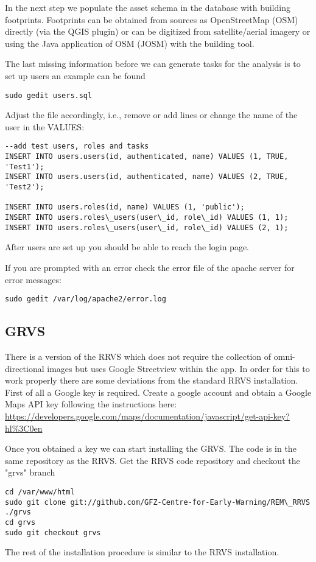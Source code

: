 \documentclass{article}
\begin{document}
In the next step we populate the asset schema in the database 
with building footprints. Footprints can be obtained from
sources as OpenStreetMap (OSM) directly (via the QGIS plugin)
 or can be digitized from 
satellite/aerial imagery or using the Java application of OSM
(JOSM) with the building tool.


The last missing information before we can generate tasks
for the analysis is to set up users an example can be found
\begin{verbatim}
sudo gedit users.sql
\end{verbatim}

Adjust the file accordingly, i.e., remove or add lines or change the
name of the user in the VALUES: 
\begin{verbatim}
--add test users, roles and tasks
INSERT INTO users.users(id, authenticated, name) VALUES (1, TRUE, 'Test1');
INSERT INTO users.users(id, authenticated, name) VALUES (2, TRUE, 'Test2');

INSERT INTO users.roles(id, name) VALUES (1, 'public');
INSERT INTO users.roles\_users(user\_id, role\_id) VALUES (1, 1);
INSERT INTO users.roles\_users(user\_id, role\_id) VALUES (2, 1);
\end{verbatim}


After users are set up you should be able to reach the login
page.

If you are prompted with an error check the error file of the apache
server for error messages:

\begin{verbatim}
sudo gedit /var/log/apache2/error.log
\end{verbatim}

\subsection{GRVS}
There is a version of the RRVS which does not require the
collection of omni-directional images but uses Google Streetview
within the app. In order for this to work properly there
are some deviations from the standard RRVS installation.
First of all a Google key is required.
Create a google account and obtain a Google Maps API key
following the instructions here:
\url{https://developers.google.com/maps/documentation/javascript/get-api-key?hl%3C0en}

Once you obtained a key we can start installing the GRVS.
The code is in the same repository as the RRVS.
Get the RRVS code repository and checkout the "grvs" branch 

\begin{verbatim}
cd /var/www/html
sudo git clone git://github.com/GFZ-Centre-for-Early-Warning/REM\_RRVS ./grvs
cd grvs
sudo git checkout grvs
\end{verbatim}

The rest of the installation procedure is similar to the RRVS 
installation. 
\end{document}
